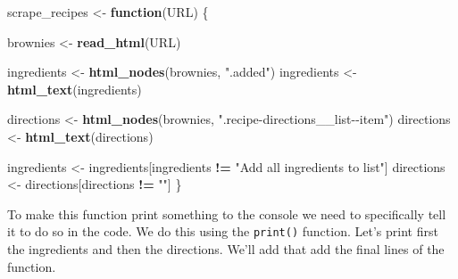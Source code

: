 \documentclass[
  12pt,
]{book}
\newenvironment{Shaded}{\begin{snugshade}}{\end{snugshade}}
\newcommand{\ControlFlowTok}[1]{\textcolor[rgb]{0.13,0.29,0.53}{\textbf{#1}}}
\newcommand{\KeywordTok}[1]{\textcolor[rgb]{0.13,0.29,0.53}{\textbf{#1}}}
\newcommand{\NormalTok}[1]{#1}
\newcommand{\OperatorTok}[1]{\textcolor[rgb]{0.81,0.36,0.00}{\textbf{#1}}}
\newcommand{\StringTok}[1]{\textcolor[rgb]{0.31,0.60,0.02}{#1}}
\begin{document}
\begin{Shaded}
\begin{Highlighting}[]
\NormalTok{scrape\_recipes <{-}}\StringTok{ }\ControlFlowTok{function}\NormalTok{(URL) \{}
  
\NormalTok{  brownies <{-}}\StringTok{ }\KeywordTok{read\_html}\NormalTok{(URL)}
  
\NormalTok{  ingredients <{-}}\StringTok{ }\KeywordTok{html\_nodes}\NormalTok{(brownies, }\StringTok{".added"}\NormalTok{)}
\NormalTok{  ingredients <{-}}\StringTok{ }\KeywordTok{html\_text}\NormalTok{(ingredients)}
  
\NormalTok{  directions <{-}}\StringTok{ }\KeywordTok{html\_nodes}\NormalTok{(brownies, }\StringTok{".recipe{-}directions\_\_list{-}{-}item"}\NormalTok{)}
\NormalTok{  directions <{-}}\StringTok{ }\KeywordTok{html\_text}\NormalTok{(directions)}
  
\NormalTok{  ingredients <{-}}\StringTok{ }\NormalTok{ingredients[ingredients }\OperatorTok{!=}\StringTok{ "Add all ingredients to list"}\NormalTok{]}
\NormalTok{  directions <{-}}\StringTok{ }\NormalTok{directions[directions }\OperatorTok{!=}\StringTok{ ""}\NormalTok{]}
\NormalTok{\}}
\end{Highlighting}
\end{Shaded}

To make this function print something to the console we need to specifically tell it to do so in the code. We do this using the \texttt{print()} function. Let's print first the ingredients and then the directions. We'll add that add the final lines of the function.
\end{document}
